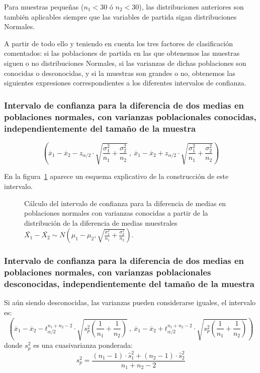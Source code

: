 Para muestras pequeñas ($n_1<30$ ó $n_2<30$), las distribuciones anteriores son también aplicables siempre que las
variables de partida sigan distribuciones Normales.

A partir de todo ello y teniendo en cuenta los tres factores de clasificación comentados: si las poblaciones de partida
en las que obtenemos las muestras siguen o no distribuciones Normales, si las varianzas de dichas poblaciones son
conocidas o desconocidas, y si la muestras son grandes o no, obtenemos las siguientes expresiones correspondientes a los
diferentes intervalos de confianza.


\subsubsection {Intervalo de confianza para la diferencia de dos medias en poblaciones normales, con varianzas
poblacionales conocidas, independientemente del tamaño de la muestra}
\[
\left( \overline{x}_{1}-\overline{x}_{2}-z_{\alpha /2}\cdot 
\sqrt{\dfrac{\sigma_{1}^{2}}{n_{1}}+\dfrac{\sigma_{2}^{2}}{n_{2}}}\ ,\
\overline{x}_{1}-\overline{x}_{2}+z_{\alpha/2}\cdot \sqrt{\dfrac{\sigma_{1}^{2}}{n_{1}}+\dfrac{\sigma
_{2}^{2}}{n_{2}}}\right)
\]

En la figura~\ref{intervalodiferencia} aparece un esquema explicativo de la construcción de este intervalo.

\begin{figure}[h!]
\begin{center}
\scalebox{0.8}{}
\caption{Cálculo del intervalo de confianza para la diferencia de medias en poblaciones normales con varianzas conocidas a partir de la
distribución de la diferencia de medias muestrales $\bar{X_1}-\bar{X_2}\sim
N(\mu_1-\mu_2,\sqrt{\frac{\sigma_1^2}{n_1}+\frac{\sigma_2^2}{n_2}})$.}
\label{intervalodiferencia}
\end{center}
\end{figure}

\subsubsection {Intervalo de confianza para la diferencia de dos medias en poblaciones normales, con varianzas
poblacionales desconocidas, independientemente del tamaño de la muestra}
Si aún siendo desconocidas, las varianzas pueden considerarse iguales, el intervalo es:
\[
\left( \overline{x}_{1}-\overline{x}_{2}-t_{\alpha
/2}^{n_{1}+n_{2}-2}\cdot
\sqrt{s_{p}^{2}\left( \dfrac{1}{n_{1}}+\dfrac{1}{n_{2}}\right) }\ ,\ \overline{
x}_{1}-\overline{x}_{2}+t_{\alpha /2}^{n_{1}+n_{2}-2}\cdot \sqrt{
s_{p}^{2}\left( \dfrac{1}{n_{1}}+\dfrac{1}{n_{2}}\right) }\right)
\]
donde $s_{p}^{2}$ es una cuasivarianza ponderada:
\[
s_{p}^{2}=\dfrac{\left( n_{1}-1\right) \cdot \hat s_{1}^{2}+\left(n_{2}-1\right) \cdot
\hat s_{2}^{2}}{n_{1}+n_{2}-2}
\]

